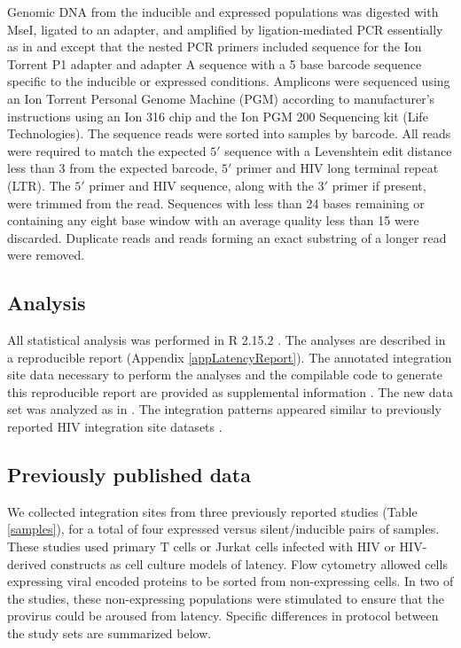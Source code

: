 \documentclass[../sherrill-Mix_thesis.tex]{subfiles}
\begin{document}
		Genomic DNA from the inducible and expressed populations was digested with MseI, ligated to an adapter, and amplified by ligation-mediated PCR essentially as in \citet{Wu2003} and \citet{Mitchell2004}  except that the nested PCR primers included sequence for the Ion Torrent P1 adapter and adapter A sequence with a 5 base barcode sequence specific to the inducible or expressed conditions. Amplicons were sequenced using an Ion Torrent Personal Genome Machine (PGM) according to manufacturer's instructions using an Ion 316 chip and the Ion PGM 200 Sequencing kit (Life Technologies). The sequence reads were sorted into samples by barcode. All reads were required to match the expected $5'$ sequence with a Levenshtein edit distance less than 3 from the expected barcode, $5'$ primer and HIV long terminal repeat (LTR). The $5'$ primer and HIV sequence, along with the $3'$ primer if present, were trimmed from the read. Sequences with less than 24 bases remaining or containing any eight base window with an average quality less than 15 were discarded. Duplicate reads and reads forming an exact substring of a longer read were removed. 

	\subsection{Analysis}
		All statistical analysis was performed in R 2.15.2 \citep{RCoreTeam2012}. The analyses are described in a reproducible report (Appendix \ref{appLatencyReport}). The annotated integration site data necessary to perform the analyses and the compilable code to generate this reproducible report are provided as supplemental information \citep{Sherrill-Mix2013}. The new \Memory{} data set was analyzed as in \citet{Berry2006}.  The integration patterns appeared similar to previously reported HIV integration site datasets \citep{Wang2007a}.

	\subsection{Previously published data}
		We collected integration sites from three previously reported studies (Table \ref{samples}), for a total of four expressed versus silent/inducible pairs of samples. These studies used primary \cdFour{} T cells or Jurkat cells infected with HIV or HIV-derived constructs as cell culture models of latency. Flow cytometry allowed cells expressing viral encoded proteins to be sorted from non-expressing cells. In two of the studies, these non-expressing populations were stimulated to ensure that the provirus could be aroused from latency. Specific differences in protocol between the study sets are summarized below. 
\end{document}
